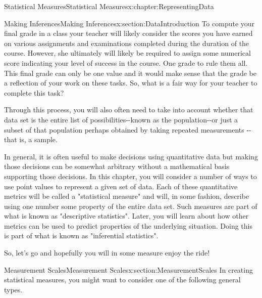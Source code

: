 \documentclass[oneside,10pt,]{book}
\numberwithin{equation}{section}
\begin{document}
\begin{chapterptx}{Statistical Measures}{}{Statistical Measures}{}{}{x:chapter:RepresentingData}
%
%
\typeout{************************************************}
\typeout{************************************************}
%
\begin{sectionptx}{Making Inferences}{}{Making Inferences}{}{}{x:section:DataIntroduction}
To compute your final grade in a class your teacher will likely consider the scores you have earned on various assignments and examinations completed during the duration of the course. However, she ultimately will likely be required to assign some numerical score indicating your level of success in the course. One grade to rule them all. This final grade can only be one value and it would make sense that the grade be a reflection of your work on these tasks. So, what is a fair way for your teacher to complete this task?%
\par
Through this process, you will also often need to take into account whether that data set is the entire list of possibilities-{}-{}known as the population-{}-{}or just a subset of that population perhaps obtained by taking repeated measurements -{}-{}that is, a sample.%
\par
In general, it is often useful to make decisions using quantitative data but making those decisions can be somewhat arbitrary without a mathematical basis supporting those decisions. In this chapter, you will consider a number of ways to use point values to represent a given set of data. Each of these quantitative metrics will be called a "statistical measure" and will, in some fashion, describe using one number some property of the entire data set. Such measures are part of what is known as "descriptive statistics".  Later, you will learn about how other metrics can be used to predict properties of the underlying situation. Doing this is part of what is known as "inferential statistics".%
\par
So, let's go and hopefully you will in some measure enjoy the ride!%
\end{sectionptx}
%
%
\typeout{************************************************}
\typeout{************************************************}
%
\begin{sectionptx}{Measurement Scales}{}{Measurement Scales}{}{}{x:section:MeasurementScales}
In creating statistical measures, you might want to consider one of the following general types.%
\par

\end{sectionptx}
\end{chapterptx}
\end{document}
